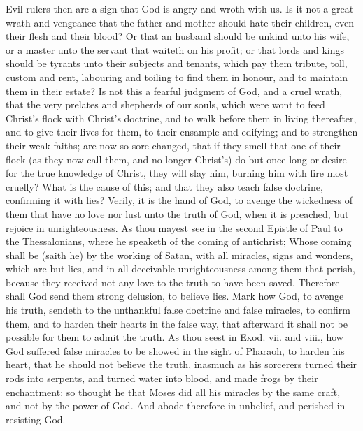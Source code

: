Evil rulers then are a sign that God is angry and wroth
with us. Is it not a great wrath and vengeance that the
father and mother should hate their children, even their
flesh and their blood? Or that an husband should be 
unkind unto his wife, or a master unto the servant that 
waiteth on his profit; or that lords and kings should be 
tyrants unto their subjects and tenants, which pay them 
tribute, toll, custom and rent, labouring and toiling to 
find them in honour, and to maintain them in their estate?
Is not this a fearful judgment of God, and a cruel wrath, 
that the very prelates and shepherds of our souls, which 
were wont to feed Christ's flock with Christ's doctrine, 
and to walk before them in living thereafter, and to give 
their lives for them, to their ensample and edifying; and 
to strengthen their weak faiths; are now so sore changed, 
that if they smell that one of their flock (as they now call 
them, and no longer Christ's) do but once long or desire 
for the true knowledge of Christ, they will slay him, 
burning him with fire most cruelly? What is the cause
of this; and that they also teach false doctrine, confirming
it with lies? Verily, it is the hand of God, to avenge the 
wickedness of them that have no love nor lust unto the 
truth of God, when it is preached, but rejoice in unrighteousness.
As thou mayest see in the second Epistle 
of Paul to the Thessalonians, where he speaketh of the 
coming of antichrist; Whose coming shall be (saith he)
by the working of Satan, with all miracles, signs and 
wonders, which are but lies, and in all deceivable unrighteousness
among them that perish, because they received 
not any love to the truth to have been saved. Therefore 
shall God send them strong delusion, to believe lies. Mark 
how God, to avenge his truth, sendeth to the unthankful 
false doctrine and false miracles, to confirm them, and to 
harden their hearts in the false way, that afterward it shall 
not be possible for them to admit the truth. As thou
seest in Exod. vii. and viii., how God suffered false miracles
to be showed in the sight of Pharaoh, to harden his 
heart, that he should not believe the truth, inasmuch as 
his sorcerers turned their rods into serpents, and turned 
water into blood, and made frogs by their enchantment:
so thought he that Moses did all his miracles by the same 
craft, and not by the power of God. And abode therefore
in unbelief, and perished in resisting God.

